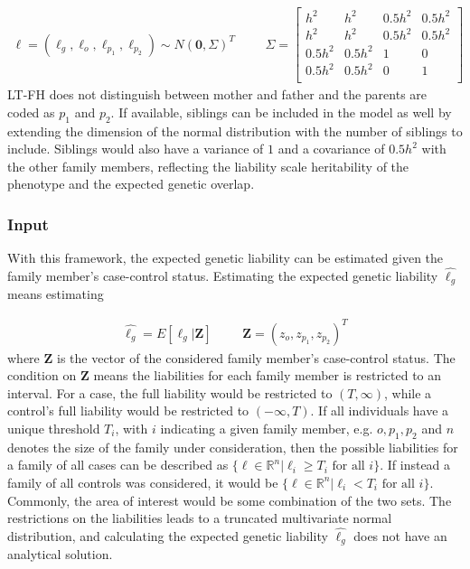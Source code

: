 \begin{align}\label{eq:LTFH_model}
\ell = \left( \ell_g, \ell_o, \ell_{p_1}, \ell_{p_2} \right) \sim N(\mathbf{0}, \Sigma)^T & & &\Sigma = \begin{bmatrix}
h^2	&	h^2	&	0.5h^2	&	0.5h^2	\\
h^2 &	h^2 &	0.5h^2	&	0.5h^2	\\
0.5h^2	&	0.5h^2	&	1	&	0	\\
0.5h^2	&	0.5h^2	&	0	&	1	\\
\end{bmatrix}
\end{align}
LT-FH does not distinguish between mother and father and the parents are coded as $ p_1 $ and $ p_2 $. If available, siblings can be included in the model as well by extending the dimension of the normal distribution with the number of siblings to include. Siblings would also have a variance of $ 1 $ and a covariance of $ 0.5h^2 $ with the other family members, reflecting the liability scale heritability of the phenotype and the expected genetic overlap.

\subsubsection{Input}

With this framework, the expected genetic liability can be estimated given the family member's case-control status. Estimating the expected genetic liability $ \hat{\ell_g} $ means estimating 

\begin{align*}
\hat{\ell_g} = E\left[ \ell_g | \mathbf{Z} \right] & & & \mathbf{Z} = \left(z_o, z_{p_1}, z_{p_2} \right)^T
\end{align*}
where $ \mathbf{Z} $ is the vector of the considered family member's case-control status. The condition on $ \mathbf{Z} $ means the liabilities for each family member is restricted to an interval. For a case, the full liability would be restricted to $ (T, \infty) $, while a control's full liability would be restricted to $ (-\infty, T) $. If all individuals have a unique threshold $ T_i $, with $ i $ indicating a given family member, e.g. $ o, p_1, p_2 $ and $ n $ denotes the size of the family under consideration, then the possible liabilities for a family of all cases can be described as $ \{ \ell \in \mathbb{R}^n | \ell_i \geq T_i \text{ for all } i\} $. If instead a family of all controls was considered, it would be $ \{ \ell \in \mathbb{R}^n | \ell_i < T_i \text{ for all } i\} $. Commonly, the area of interest would be some combination of the two sets. The restrictions on the liabilities leads to a truncated multivariate normal distribution, and calculating the expected genetic liability $ \hat{\ell_g} $ does not have an analytical solution. 

